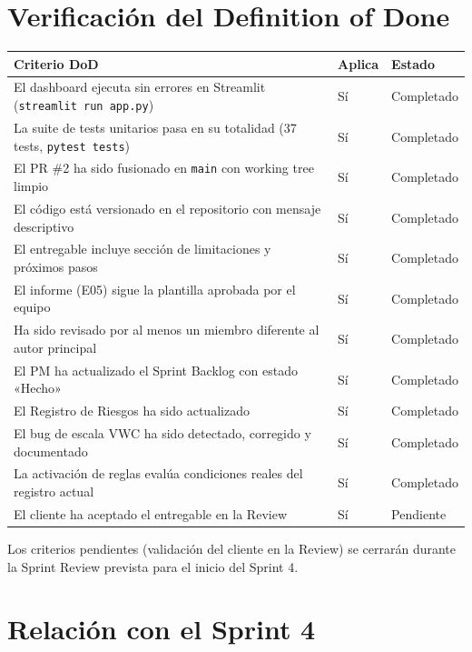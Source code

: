 \documentclass[11pt,a4paper]{article}
\begin{document}
\section{Verificación del Definition of Done}

\begin{longtable}{p{} p{} p{}}
\textbf{Criterio DoD} & \textbf{Aplica} & \textbf{Estado} \\
\hline
El dashboard ejecuta sin errores en Streamlit (\texttt{streamlit run app.py}) & Sí & Completado \\
La suite de tests unitarios pasa en su totalidad (37 tests, \texttt{pytest tests}) & Sí & Completado \\
El PR \#2 ha sido fusionado en \texttt{main} con working tree limpio & Sí & Completado \\
El código está versionado en el repositorio con mensaje descriptivo & Sí & Completado \\
El entregable incluye sección de limitaciones y próximos pasos & Sí & Completado \\
El informe (E05) sigue la plantilla aprobada por el equipo & Sí & Completado \\
Ha sido revisado por al menos un miembro diferente al autor principal & Sí & Completado \\
El PM ha actualizado el Sprint Backlog con estado «Hecho» & Sí & Completado \\
El Registro de Riesgos ha sido actualizado & Sí & Completado \\
El bug de escala VWC ha sido detectado, corregido y documentado & Sí & Completado \\
La activación de reglas evalúa condiciones reales del registro actual & Sí & Completado \\
El cliente ha aceptado el entregable en la Review & Sí & Pendiente \\
\end{longtable}

Los criterios pendientes (validación del cliente en la Review) se cerrarán durante la Sprint
Review prevista para el inicio del Sprint 4.

\section{Relación con el Sprint 4}
\end{document}
